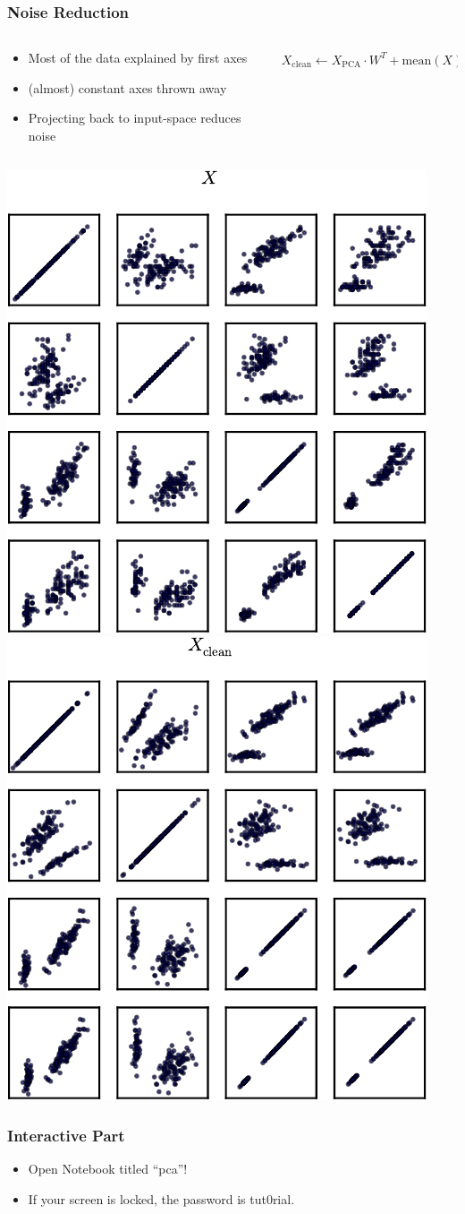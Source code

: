 \begin{frame}[fragile]
  \frametitle{Noise Reduction}
  \begin{columns}
      \begin{column}{.7\linewidth}
          \begin{itemize}
              \item Most of the data explained by first axes
              \item (almost) constant axes thrown away
              \item Projecting back to input-space reduces noise
          \end{itemize}
      \end{column}
      \begin{column}{.3\linewidth}
          \begin{align*}
              \!\!\!\!\!\!X_{\mathrm{clean}} \leftarrow X_{\mathrm{PCA}}\cdot 
              W^T + \mathrm{mean}(X)
          \end{align*}
      \end{column}
  \end{columns}
  \begin{center}
    \includegraphics[width=.40\linewidth]{pca-pics/iris-all-nocolor}\hfill%
    \includegraphics[width=.40\linewidth]{pca-pics/iris-bt-nocolor}
  \end{center}

  \begin{frame}
      \frametitle{Interactive Part}
      \begin{itemize}
          \item Open Notebook titled ``pca''!
          \item If your screen is locked, the password is tut0rial.
      \end{itemize}
  \end{frame}
\end{frame}



